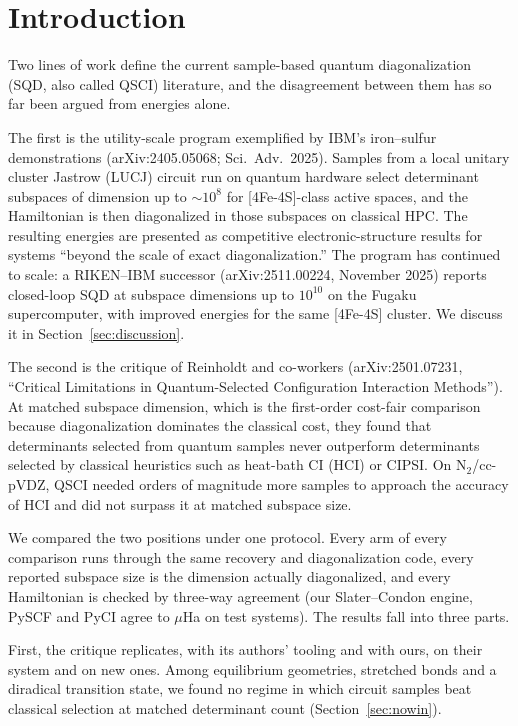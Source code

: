 \documentclass[11pt]{article}
\begin{document}
\section{Introduction}

Two lines of work define the current sample-based quantum diagonalization (SQD, also called QSCI) literature, and the disagreement between them has so far been argued from energies alone.

The first is the utility-scale program exemplified by IBM's iron--sulfur demonstrations (arXiv:2405.05068; Sci.\ Adv.\ 2025). Samples from a local unitary cluster Jastrow (LUCJ) circuit run on quantum hardware select determinant subspaces of dimension up to ${\sim}10^8$ for [4Fe-4S]-class active spaces, and the Hamiltonian is then diagonalized in those subspaces on classical HPC. The resulting energies are presented as competitive electronic-structure results for systems ``beyond the scale of exact diagonalization.'' The program has continued to scale: a RIKEN--IBM successor (arXiv:2511.00224, November 2025) reports closed-loop SQD at subspace dimensions up to $10^{10}$ on the Fugaku supercomputer, with improved energies for the same [4Fe-4S] cluster. We discuss it in Section~\ref{sec:discussion}.

The second is the critique of Reinholdt and co-workers (arXiv:2501.07231, ``Critical Limitations in Quantum-Selected Configuration Interaction Methods''). At matched subspace dimension, which is the first-order cost-fair comparison because diagonalization dominates the classical cost, they found that determinants selected from quantum samples never outperform determinants selected by classical heuristics such as heat-bath CI (HCI) or CIPSI. On N$_2$/cc-pVDZ, QSCI needed orders of magnitude more samples to approach the accuracy of HCI and did not surpass it at matched subspace size.

We compared the two positions under one protocol. Every arm of every comparison runs through the same recovery and diagonalization code, every reported subspace size is the dimension actually diagonalized, and every Hamiltonian is checked by three-way agreement (our Slater--Condon engine, PySCF and PyCI agree to $\mu$Ha on test systems). The results fall into three parts.

First, the critique replicates, with its authors' tooling and with ours, on their system and on new ones. Among equilibrium geometries, stretched bonds and a diradical transition state, we found no regime in which circuit samples beat classical selection at matched determinant count (Section~\ref{sec:nowin}).
\end{document}
